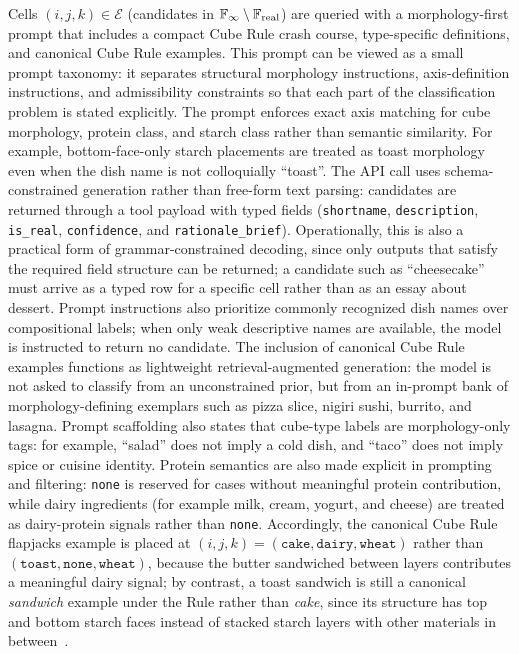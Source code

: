 Cells $(i,j,k) \in \mathcal{E}$ (candidates in $\mathbb{F}_{\infty} \setminus \mathbb{F}_{\mathrm{real}}$) are queried with a morphology-first prompt that includes a compact Cube Rule crash course, type-specific definitions, and canonical Cube Rule examples.
This prompt can be viewed as a small prompt taxonomy: it separates structural morphology instructions, axis-definition instructions, and admissibility constraints so that each part of the classification problem is stated explicitly.
The prompt enforces exact axis matching for cube morphology, protein class, and starch class rather than semantic similarity.
For example, bottom-face-only starch placements are treated as toast morphology even when the dish name is not colloquially ``toast''.
The API call uses schema-constrained generation rather than free-form text parsing: candidates are returned through a tool payload with typed fields (\texttt{shortname}, \texttt{description}, \texttt{is\_real}, \texttt{confidence}, and \texttt{rationale\_brief}).
Operationally, this is also a practical form of grammar-constrained decoding, since only outputs that satisfy the required field structure can be returned; a candidate such as ``cheesecake'' must arrive as a typed row for a specific cell rather than as an essay about dessert.
Prompt instructions also prioritize commonly recognized dish names over compositional labels; when only weak descriptive names are available, the model is instructed to return no candidate.
The inclusion of canonical Cube Rule examples functions as lightweight retrieval-augmented generation: the model is not asked to classify from an unconstrained prior, but from an in-prompt bank of morphology-defining exemplars such as pizza slice, nigiri sushi, burrito, and lasagna.
Prompt scaffolding also states that cube-type labels are morphology-only tags: for example, ``salad'' does not imply a cold dish, and ``taco'' does not imply spice or cuisine identity.
Protein semantics are also made explicit in prompting and filtering: \texttt{none} is reserved for cases without meaningful protein contribution, while dairy ingredients (for example milk, cream, yogurt, and cheese) are treated as dairy-protein signals rather than \texttt{none}.
Accordingly, the canonical Cube Rule flapjacks example is placed at $(i,j,k) = (\texttt{cake}, \texttt{dairy}, \texttt{wheat})$ rather than $(\texttt{toast}, \texttt{none}, \texttt{wheat})$, because the butter sandwiched between layers contributes a meaningful dairy signal; by contrast, a toast sandwich is still a canonical \emph{sandwich} example under the Rule rather than \emph{cake}, since its structure has top and bottom starch faces instead of stacked starch layers with other materials in between~\cite{toast_sandwich}.

